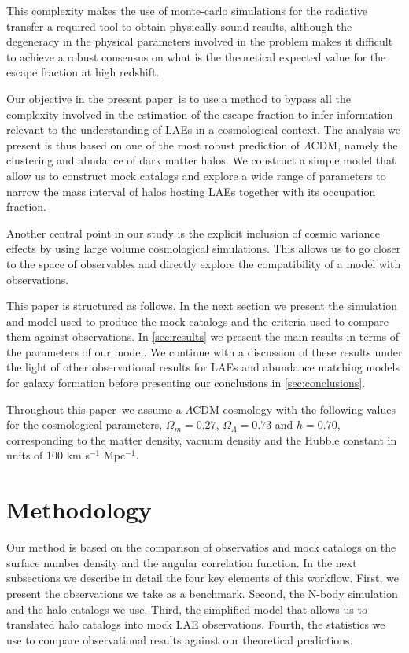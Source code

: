 \documentclass[usenatbib]{mn2e}
\newcommand{\documentname}{paper~}
\newcommand{\ly}{{\ifmmode{{\rm Ly}\alpha}\else{Ly$\alpha$~}\fi}}
\begin{document}
This complexity makes the use of monte-carlo simulations for the
radiative transfer a required tool to obtain physically sound results,
although the degeneracy in the physical parameters involved in the
problem makes it difficult to achieve a robust consensus on what is
the theoretical expected value for the \ly escape fraction
at high redshift. 

Our objective in the present \documentname is to use a method to
bypass all the complexity involved in the estimation of the \ly escape
fraction to infer information relevant to the understanding of LAEs in
a cosmological context. The analysis we present is thus based on one
of the most robust prediction of $\Lambda$CDM, namely the clustering
and abudance of dark matter halos. We construct a simple model that
allow us to construct mock catalogs and explore a wide range of
parameters to narrow the mass interval of halos hosting LAEs together
with its occupation fraction. 

Another central point in our study is the explicit inclusion of cosmic
variance effects by using large volume cosmological simulations. This
allows us to go closer to the space of observables and directly
explore the compatibility of a model with observations.

This paper is structured as follows. In the next section we present
the simulation and model used to produce the mock catalogs and the criteria
used to compare them against observations. In \SS \ref{sec:results} we
present the main results in terms of the parameters of our model. We
continue with a discussion of these results under the light of other
observational results for LAEs and abundance matching models for
galaxy formation before presenting our conclusions in \SS
\ref{sec:conclusions}. 

Throughout this \documentname we assume a $\Lambda$CDM cosmology with the
following values for the cosmological parameters, $\Omega_{m}=0.27$,
$\Omega_{\Lambda}=0.73$ and $h=0.70$, corresponding to the matter
density, vacuum density and the Hubble constant in units of 100 km
s$^{-1}$ Mpc$^{-1}$. 

\section{Methodology}

Our method is based on the comparison of observatios and mock
catalogs on the surface number density and the angular correlation
function.  In the next subsections we describe in detail the four key
elements of this workflow. First, we present the observations we take
as a benchmark. Second, the N-body simulation and the halo catalogs we
use. Third, the simplified model that allows us to translated halo
catalogs into mock LAE observations. Fourth, the statistics we use to
compare observational results against our theoretical predictions. 
\end{document}
